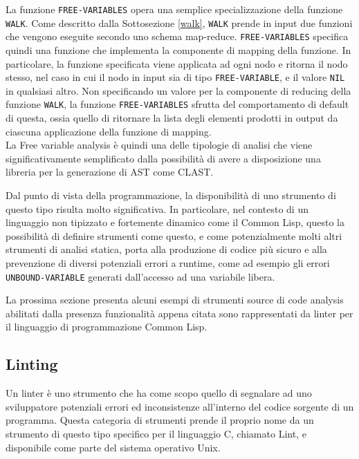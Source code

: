 La funzione \texttt{FREE-VARIABLES} opera una semplice specializzazione della
funzione \texttt{WALK}. Come descritto dalla Sottosezione \ref{walk},
\texttt{WALK} prende in input due funzioni che vengono eseguite secondo uno
schema map-reduce. \texttt{FREE-VARIABLES} specifica quindi una funzione che
implementa la componente di mapping della funzione. In particolare, la funzione
specificata viene applicata ad ogni nodo e ritorna il nodo stesso, nel caso in
cui il nodo in input sia di tipo \texttt{FREE-VARIABLE}, e il valore
\texttt{NIL} in qualsiasi altro. Non specificando un valore per la componente di
reducing della funzione \texttt{WALK}, la funzione \texttt{FREE-VARIABLES}
sfrutta del comportamento di default di questa, ossia quello di ritornare la
lista degli elementi prodotti in output da ciascuna applicazione della funzione
di mapping.\\

La Free variable analysis è quindi una delle tipologie di analisi che viene
significativamente semplificato dalla possibilità di avere a disposizione una
libreria per la generazione di AST come CLAST.

Dal punto di vista della programmazione, la disponibilità di uno strumento di
questo tipo risulta molto significativa. In particolare, nel contesto di un
linguaggio non tipizzato e fortemente dinamico come il Common Lisp, questo la
possibilità di definire strumenti come questo, e come potenzialmente molti altri
strumenti di analisi statica, porta alla produzione di codice più sicuro e alla
prevenzione di diversi potenziali errori a runtime, come ad esempio gli errori
\texttt{UNBOUND-VARIABLE} generati dall'accesso ad una variabile libera.

La prossima sezione presenta alcuni esempi di strumenti source di code analysis
abilitati dalla presenza funzionalità appena citata sono rappresentati da linter
per il linguaggio di programmazione Common Lisp.

\subsection{Linting}

Un linter è uno strumento che ha come scopo quello di segnalare ad uno
sviluppatore potenziali errori ed inconsistenze all'interno del codice sorgente
di un programma. Questa categoria di strumenti prende il proprio nome da un
strumento di questo tipo specifico per il linguaggio C, chiamato Lint, e
disponibile come parte del sistema operativo Unix. \cite{johnson1977lint}

